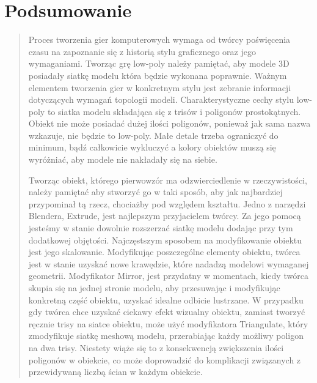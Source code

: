 \newpage
\chapter{Podsumowanie}
\begin{quotation}

\indent Proces tworzenia gier komputerowych wymaga od twórcy poświęcenia czasu na zapoznanie się z historią stylu graficznego oraz jego wymaganiami. Tworząc grę low-poly należy pamiętać, aby modele 3D posiadały siatkę modelu która będzie wykonana poprawnie. Ważnym elementem tworzenia gier w konkretnym stylu jest zebranie informacji dotyczących wymagań topologii modeli. Charakterystyczne cechy stylu low-poly to siatka modelu składająca się z trisów i poligonów prostokątnych. Obiekt nie może posiadać dużej ilości poligonów, ponieważ jak sama nazwa wzkazuje, nie będzie to low-poly. Małe detale trzeba ograniczyć do minimum, bądź całkowicie wykluczyć a kolory obiektów muszą się wyróżniać, aby modele nie nakładały się na siebie. 

\indent Tworząc obiekt, którego pierwowzór ma odzwierciedlenie w rzeczywistości, należy pamiętać aby stworzyć go w taki sposób, aby jak najbardziej przypominał tą rzecz, chociażby pod względem kształtu. Jedno z narzędzi Blendera, Extrude, jest najlepszym przyjacielem twórcy. Za jego pomocą jesteśmy w stanie dowolnie rozszerzać siatkę modelu dodając przy tym dodatkowej objętości. Najczęstszym sposobem na modyfikowanie obiektu jest jego skalowanie. Modyfikując poszczególne elementy obiektu, twórca jest w stanie uzyskać nowe krawędzie, które nadadzą modelowi wymaganej geometrii. Modyfikator Mirror, jest przydatny w momentach, kiedy twórca skupia się na jednej stronie modelu, aby przesuwając i modyfikując konkretną część obiektu, uzyskać idealne odbicie lustrzane. W przypadku gdy twórca chce uzyskać ciekawy efekt wizualny obiektu, zamiast tworzyć ręcznie trisy na siatce obiektu, może użyć modyfikatora Triangulate, który zmodyfikuje siatkę meshową modelu, przerabiając każdy możliwy poligon na dwa trisy. Niestety wiąże się to z konsekwencją zwiększenia ilości poligonów w obiekcie, co może doprowadzić do komplikacji związanych z przewidywaną liczbą ścian w każdym obiekcie.


\end{quotation}
